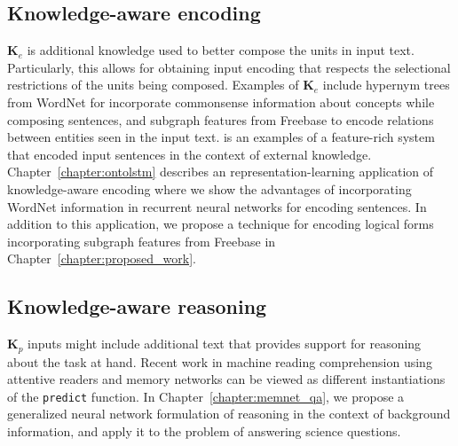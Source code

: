\subsection{Knowledge-aware encoding}
$\mathbf{K}_e$ is additional knowledge used to better compose the units in input text. Particularly, this allows for
obtaining input encoding that respects the selectional restrictions of the units being composed.
Examples of $\mathbf{K}_e$ include hypernym trees from WordNet for
incorporate commonsense information about concepts while composing sentences, and subgraph features from Freebase to encode relations
between entities seen in the input text. \cite{moldovan2001logic} is an examples of a feature-rich system that encoded input sentences in the 
context of external knowledge. Chapter~\ref{chapter:ontolstm} describes an representation-learning application of knowledge-aware encoding where 
we show the advantages of incorporating WordNet information in recurrent neural networks for encoding sentences. In addition to this application,
we propose a technique for encoding logical forms incorporating subgraph features from Freebase in Chapter~\ref{chapter:proposed_work}.

\subsection{Knowledge-aware reasoning}
$\textbf{K}_p$ inputs might include additional text that provides support for reasoning about the task at hand. Recent work in machine reading comprehension using 
attentive readers \cite{hermann2015teaching} and memory networks \cite{weston2014memory,Sukhbaatar2015EndToEndMN,Xiong2016DynamicMN} can be viewed as different instantiations
of the \texttt{predict} function. In Chapter~\ref{chapter:memnet_qa}, we propose a generalized neural network formulation of reasoning in the context of background information,
and apply it to the problem of answering science questions.

